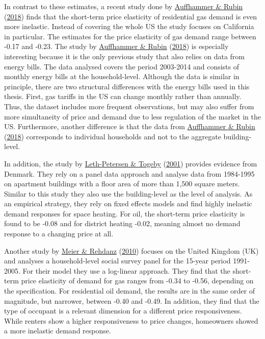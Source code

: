 \documentclass[12pt,twoside]{reedthesis}
\begin{document}
In contrast to these estimates, a recent study done by \protect\hyperlink{ref-auffhammer_rubin18}{Auffhammer \& Rubin} (\protect\hyperlink{ref-auffhammer_rubin18}{2018}) finds that the short-term price elasticity of residential gas demand is even more inelastic. Instead of covering the whole US the study focuses on California in particular. The estimates for the price elasticity of gas demand range between -0.17 and -0.23. The study by \protect\hyperlink{ref-auffhammer_rubin18}{Auffhammer \& Rubin} (\protect\hyperlink{ref-auffhammer_rubin18}{2018}) is especially interesting because it is the only previous study that also relies on data from energy bills. The data analysed covers the period 2003-2014 and consists of monthly energy bills at the household-level. Although the data is similar in principle, there are two structural differences with the energy bills used in this thesis. First, gas tariffs in the US can change monthly rather than annually. Thus, the dataset includes more frequent observations, but may also suffer from more simultaneity of price and demand due to less regulation of the market in the US. Furthermore, another difference is that the data from \protect\hyperlink{ref-auffhammer_rubin18}{Auffhammer \& Rubin} (\protect\hyperlink{ref-auffhammer_rubin18}{2018}) corresponds to individual households and not to the aggregate building-level.

In addition, the study by \protect\hyperlink{ref-leth-petersen_togeby01}{Leth-Petersen \& Togeby} (\protect\hyperlink{ref-leth-petersen_togeby01}{2001}) provides evidence from Denmark. They rely on a panel data approach and analyse data from 1984-1995 on apartment buildings with a floor area of more than 1,500 square meters. Similar to this study they also use the building-level as the level of analysis. As an empirical strategy, they rely on fixed effects models and find highly inelastic demand responses for space heating. For oil, the short-term price elasticity is found to be -0.08 and for district heating -0.02, meaning almost no demand response to a changing price at all.

Another study by \protect\hyperlink{ref-meier_rehdanz10}{Meier \& Rehdanz} (\protect\hyperlink{ref-meier_rehdanz10}{2010}) focuses on the United Kingdom (UK) and analyses a household-level social survey panel for the 15-year period 1991-2005. For their model they use a log-linear approach. They find that the short-term price elasticity of demand for gas ranges from -0.34 to -0.56, depending on the specification. For residential oil demand, the results are in the same order of magnitude, but narrower, between -0.40 and -0.49. In addition, they find that the type of occupant is a relevant dimension for a different price responsiveness. While renters show a higher responsiveness to price changes, homeowners showed a more inelastic demand response.
\end{document}
